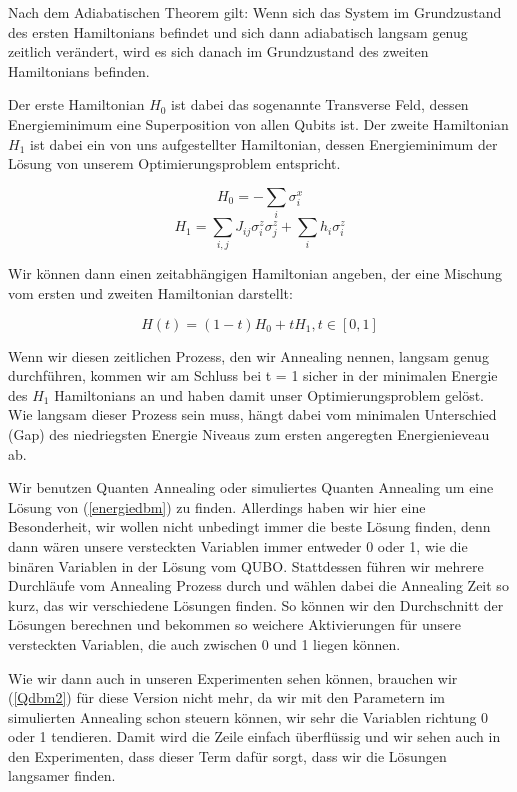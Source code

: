 Nach dem Adiabatischen Theorem gilt: Wenn sich das System im Grundzustand des ersten Hamiltonians befindet und sich dann adiabatisch langsam genug zeitlich verändert, wird es sich danach im Grundzustand des zweiten Hamiltonians befinden. 

Der erste Hamiltonian $H_{0}$ ist dabei das sogenannte Transverse Feld, dessen Energieminimum eine Superposition von allen Qubits ist. 
Der zweite Hamiltonian $H_{1}$ ist dabei ein von uns aufgestellter Hamiltonian, dessen Energieminimum der Lösung von unserem Optimierungsproblem entspricht.

\begin{equation}
    H_{0} = - \sum_{i} \sigma^{x}_{i}
 \end{equation}
\begin{equation}
    H_{1} = \sum_{i, j} J_{ij} \sigma^{z}_{i}  \sigma^{z}_{j}  + \sum_{i} h_i \sigma^{z}_{i}
 \end{equation}

Wir können dann einen zeitabhängigen Hamiltonian angeben, der eine Mischung vom ersten und zweiten Hamiltonian darstellt:

\begin{equation}
    H(t) = (1-t) H_{0} + t H_{1} , t \in [0,1]
 \end{equation}

Wenn wir diesen zeitlichen Prozess, den wir Annealing nennen, langsam genug durchführen, kommen wir am Schluss bei t = 1 sicher in der minimalen Energie des $H_{1}$ Hamiltonians an und haben damit unser Optimierungsproblem gelöst.
Wie langsam dieser Prozess sein muss, hängt dabei vom minimalen Unterschied (Gap) des niedriegsten Energie Niveaus zum ersten angeregten Energienieveau ab.

Wir benutzen Quanten Annealing oder simuliertes Quanten Annealing um eine Lösung von (\ref{energiedbm}) zu finden. Allerdings haben wir hier eine Besonderheit, wir wollen nicht unbedingt immer die beste Lösung finden, denn dann wären unsere versteckten Variablen immer entweder 0 oder 1, wie die binären Variablen in der Lösung vom QUBO. Stattdessen führen wir mehrere Durchläufe vom Annealing Prozess durch und wählen dabei die Annealing Zeit so kurz, das wir verschiedene Lösungen finden. So können wir den Durchschnitt der Lösungen berechnen und bekommen so weichere Aktivierungen für unsere versteckten Variablen, die auch zwischen 0 und 1 liegen können.

Wie wir dann auch in unseren Experimenten sehen können, brauchen wir (\ref{Qdbm2}) für diese Version nicht mehr, da wir mit den Parametern im simulierten Annealing schon steuern können, wir sehr die Variablen richtung 0 oder 1 tendieren. Damit wird die Zeile einfach überflüssig und wir sehen auch in den Experimenten, dass dieser Term dafür sorgt, dass wir die Lösungen langsamer finden.

